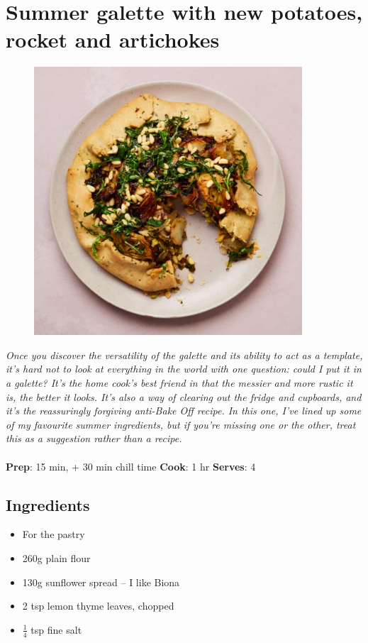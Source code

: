 \documentclass{book}
\begin{document}
\section{Summer galette with new potatoes, rocket and artichokes}
\begin{figure}
\centering\includegraphics[width=10cm,height=10cm,keepaspectratio]{Recipe_Pictures/Summer_galette_with_new_potatoes,_rocket_and_artichokes.png}
\end{figure}
\emph{Once you discover the versatility of the galette and its ability to act as a template, it’s hard not to look at everything in the world with one question: could I put it in a galette? It’s the home cook’s best friend in that the messier and more rustic it is, the better it looks. It’s also a way of clearing out the fridge and cupboards, and it’s the reassuringly forgiving anti-Bake Off recipe. In this one, I’ve lined up some of my favourite summer ingredients, but if you’re missing one or the other, treat this as a suggestion rather than a recipe. }\\\\ 
\textbf{Prep}: 15 min, + 30 min chill time
\textbf{Cook}: 1 hr
\textbf{Serves}: 4
\subsection*{Ingredients}
\begin{itemize}
\item For the pastry
\item 260g plain flour 
\item 130g sunflower spread – I like Biona 
\item 2 tsp lemon thyme leaves, chopped 
\item $\frac{1}{4}$ tsp fine salt 
\end{itemize}
\end{document}
